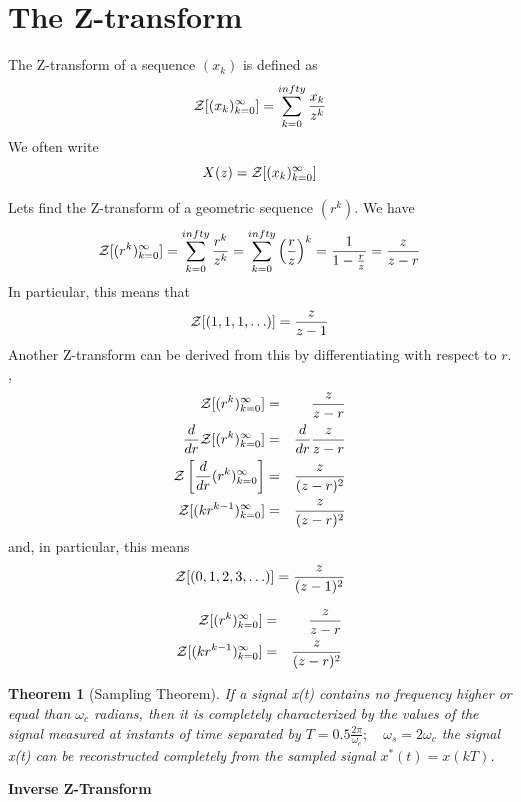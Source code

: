 \documentclass{scrreprt}
\theoremstyle{plain}
\newtheorem{theorem}{Theorem}[section]
\theoremstyle{definition}
\theoremstyle{remark}
\begin{document}
\section{The Z-transform}
The Z-transform of a sequence $(x_k)$ is defined as
\begin{equation}
{\cal Z}[(x_k)_{k=0}^\infty]=\sum_{k=0}^{infty}\frac{x_k}{z^k}
\end{equation}
We often write
\begin{equation}
X(z)={\cal Z}[(x_k)_{k=0}^\infty]
\end{equation}

Lets find the Z-transform of a geometric sequence $(r^k)$. We have
\begin{equation}
{\cal Z}[(r^k)_{k=0}^\infty]=\sum_{k=0}^{infty}\frac{r^k}{z^k}=\sum_{k=0}^{infty}\left(\frac{r}{z}\right)^k=\frac{1}{1-\frac{r}{z}}=\frac{z}{z-r}
\end{equation}
In particular, this means that 
\begin{equation}
{\cal Z}[(1,1,1,\ldots)]=\frac{z}{z-1}
\end{equation}
Another Z-transform can be derived from this by differentiating with respect to $r$. ,
\begin{eqnarray}
{\cal Z}[(r^k)_{k=0}^\infty]&=&\frac{z}{z-r}\cr
\frac{d}{dr}{\cal Z}[(r^k)_{k=0}^\infty]&=&\frac{d}{dr}\frac{z}{z-r}\cr
{\cal Z}\left[\frac{d}{dr}(r^k)_{k=0}^\infty\right]&=&\frac{z}{(z-r)^2}\cr
{\cal Z}[(kr^{k-1})_{k=0}^\infty]&=&\frac{z}{(z-r)^2}
\end{eqnarray}
and, in particular, this means
\begin{equation}
{\cal Z}[(0,1,2,3,\ldots)]=\frac{z}{(z-1)^2}
\end{equation}

\begin{eqnarray}
{\cal Z}[(r^k)_{k=0}^\infty]&=&\frac{z}{z-r}\cr
{\cal Z}[(kr^{k-1})_{k=0}^\infty]&=&\frac{z}{(z-r)^2}
\end{eqnarray}
\begin{theorem}[Sampling Theorem]
If a signal x(t) contains no frequency higher or equal than $\omega_c$ radians, then it is completely characterized by the values of the
signal measured at instants of time separated by $T= 0.5\frac{2\pi}{\omega_c}; \quad \omega_s=2\omega_c$ the signal x(t) can be reconstructed completely from the sampled signal
$x^\ast(t) = x(kT)$.
\end{theorem}


{\textbf{Inverse Z-Transform}}
\end{document}
